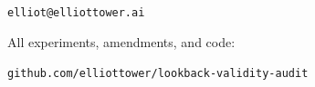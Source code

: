 \documentclass[28pt, a0paper, portrait]{tikzposter}
\begin{document}
\begin{columns}
{{  \vspace{6mm}
  \begin{center}
  \texttt{elliot@elliottower.ai}

  \vspace{3mm}
  {\small All experiments, amendments, and code:}

  \texttt{github.com/elliottower/lookback-validity-audit}
  \end{center}
}
}

\end{columns}
\end{document}
